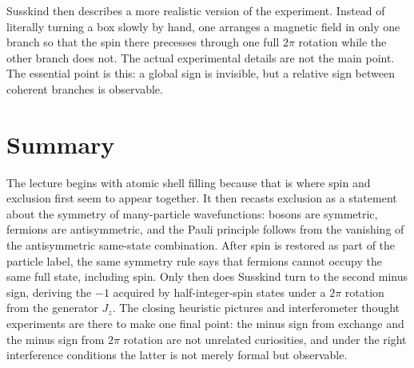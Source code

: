 Susskind then describes a more realistic version of the experiment. Instead of literally turning a box slowly by hand, one arranges a magnetic field in only one branch so that the spin there precesses through one full \(2\pi\) rotation while the other branch does not. The actual experimental details are not the main point. The essential point is this: a global sign is invisible, but a relative sign between coherent branches is observable.

\section{Summary}

The lecture begins with atomic shell filling because that is where spin and exclusion first seem to appear together. It then recasts exclusion as a statement about the symmetry of many-particle wavefunctions: bosons are symmetric, fermions are antisymmetric, and the Pauli principle follows from the vanishing of the antisymmetric same-state combination. After spin is restored as part of the particle label, the same symmetry rule says that fermions cannot occupy the same full state, including spin. Only then does Susskind turn to the second minus sign, deriving the \(-1\) acquired by half-integer-spin states under a \(2\pi\) rotation from the generator \(J_z\). The closing heuristic pictures and interferometer thought experiments are there to make one final point: the minus sign from exchange and the minus sign from \(2\pi\) rotation are not unrelated curiosities, and under the right interference conditions the latter is not merely formal but observable.